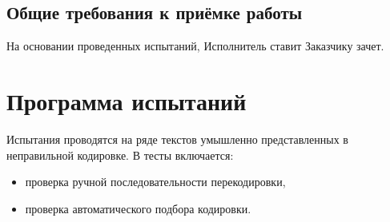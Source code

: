 \documentclass[a4paper,10pt]{article}
\begin{document}
\subsection{Общие требования к приёмке работы}
На основании проведенных испытаний, Исполнитель ставит Заказчику зачет.

\section{Программа испытаний}
Испытания проводятся на ряде текстов умышленно представленных в неправильной кодировке.
В тесты включается:
\begin{itemize}
  \item проверка ручной последовательности перекодировки,
  \item проверка автоматического подбора кодировки.
\end{itemize}
\end{document}
